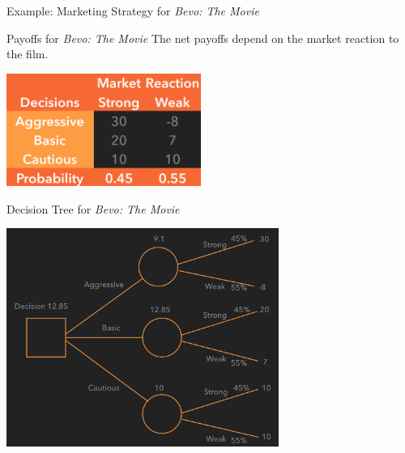 \documentclass{beamer}\usepackage[]{graphicx}\usepackage[]{color}
\begin{document}
\begin{darkframes}
\begin{frame}[fragile]{Example: Marketing Strategy for \emph{Bevo: The Movie}}
    \end{frame}



    \begin{frame}[fragile]{Payoffs for \emph{Bevo: The Movie}}
      \fontsize{10}{10}\selectfont
      The net payoffs depend on the market reaction to the film.

        \begin{center}
          \includegraphics[width=2.5in]{BevoPayoffs} 
        \end{center}
  
    \end{frame}


    \begin{frame}[fragile]{Decision Tree for \emph{Bevo: The Movie}}

        \begin{center}
          \includegraphics[width=3.5in]{BevoDecisionTree} 
        \end{center}

      \lc %
    \end{frame}



\end{darkframes}
\end{document}
